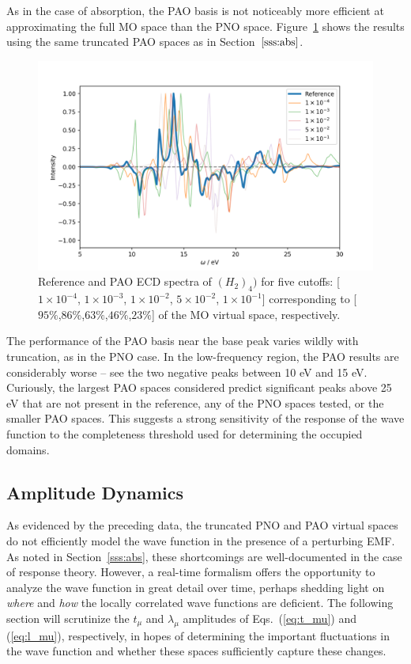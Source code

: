 As in the case of absorption, the PAO basis is not noticeably more efficient at
approximating the full MO space than the PNO space. Figure~\ref{fig:pao_ecd} 
shows the results using the same truncated PAO spaces as in Section~$\ref{sss:abs}$.
\begin{figure} 
    \centering
    \includegraphics[scale=.6]{p3/figures/pao_ecd.png}
    \caption{Reference and PAO ECD spectra of $(H_2)_4)$ for five cutoffs: 
    [$1\times 10^{-4}$, $1\times 10^{-3}$, $1\times 10^{-2}$, $5\times 10^{-2}$, 
    $1\times 10^{-1}$] corresponding to [$95\%$,$86\%$,$63\%$,$46\%$,$23\%$]
    of the MO virtual space, respectively.}
    \label{fig:pao_ecd}
\end{figure}
The performance of the PAO basis near the base peak varies wildly with truncation,
as in the PNO case. In the low-frequency region, the PAO results are considerably 
worse -- see the two negative peaks between 10 eV and 15 eV. Curiously, the 
largest PAO spaces considered predict significant peaks above 25 eV that are not 
present in the reference, any of the PNO spaces tested, or the smaller PAO
spaces. This suggests a strong sensitivity of the response of the wave function
to the completeness threshold used for determining the occupied domains.

\subsection{Amplitude Dynamics} \label{ss:amps}
As evidenced by the preceding data, the truncated PNO and PAO virtual spaces do not
efficiently model the wave function in the presence of a perturbing EMF. As noted in
Section~\ref{sss:abs}, these shortcomings are well-documented in the case of response
theory. However, a real-time formalism offers the opportunity to analyze the wave 
function in great detail over time, perhaps shedding light on \textit{where} and 
\textit{how} the locally correlated wave functions are deficient. The following
section will scrutinize the $t_\mu$ and $\lambda_\mu$ amplitudes of 
Eqs.~(\ref{eq:t_mu}) and (\ref{eq:l_mu}), respectively, in hopes of determining the 
important fluctuations in the wave function and whether these spaces sufficiently 
capture these changes.

